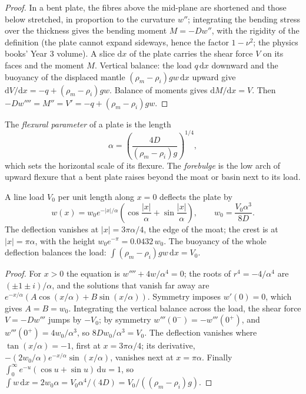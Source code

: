 \begin{proof}
In a bent plate, the fibres above the mid-plane are shortened and those below
stretched, in proportion to the curvature $w''$; integrating the bending
stress over the thickness gives the bending moment $M = -Dw''$, with the
rigidity of the definition (the plate cannot expand sideways, hence the factor
$1 - \nu^2$; the physics books' Year 3 volume). A slice $\mathrm dx$ of the plate
carries the shear force $V$ on its faces and the moment $M$. Vertical balance:
the load $q\,\mathrm dx$ downward and the buoyancy of the displaced mantle
$(\rho_m - \rho_i)gw\,\mathrm dx$ upward give $\mathrm dV/\mathrm dx = -q +
(\rho_m - \rho_i)gw$. Balance of moments gives $\mathrm dM/\mathrm dx = V$.
Then $-Dw'''' = M'' = V' = -q + (\rho_m - \rho_i)gw$.
\end{proof}

\begin{definition}\label{def:b3:gravity-geodesy:alpha}
The \emph{flexural parameter} of a plate is the
length
\[
  \alpha = \left(\frac{4D}{(\rho_m - \rho_i)g}\right)^{1/4},
\]
which sets the horizontal scale of its flexure. The \emph{forebulge}
is the low arch of upward flexure that a bent plate raises beyond the moat or
basin next to its load.
\end{definition}

\begin{proposition}\label{prop:b3:gravity-geodesy:line}
A line load $V_0$ per unit length along $x = 0$ deflects the plate by
\[
  w(x) = w_0e^{-|x|/\alpha}\left(\cos\frac{|x|}{\alpha} + \sin\frac{|x|}{\alpha}\right),
  \qquad w_0 = \frac{V_0\alpha^3}{8D} .
\]
The deflection vanishes at $|x| = 3\pi\alpha/4$, the edge of the moat; the
 crest is at $|x| = \pi\alpha$, with the height $w_0e^{-\pi} =
\num{0.0432}\,w_0$. The buoyancy of the whole deflection balances the load:
$\int(\rho_m - \rho_i)gw\,\mathrm dx = V_0$.
\end{proposition}

\begin{proof}
For $x > 0$ the equation is $w'''' + 4w/\alpha^4 = 0$; the roots of
$r^4 = -4/\alpha^4$ are $(\pm1 \pm i)/\alpha$, and the solutions that vanish far
away are $e^{-x/\alpha}(A\cos(x/\alpha) + B\sin(x/\alpha))$. Symmetry imposes
$w'(0) = 0$, which gives $A = B = w_0$. Integrating the vertical balance across
the load, the shear force $V = -Dw'''$ jumps by $-V_0$; by symmetry
$w'''(0^-) = -w'''(0^+)$, and $w'''(0^+) = 4w_0/\alpha^3$, so $8Dw_0/\alpha^3 =
V_0$. The deflection vanishes where $\tan(x/\alpha) =
-1$, first at $x = 3\pi\alpha/4$; its derivative,
$-(2w_0/\alpha)e^{-x/\alpha}\sin(x/\alpha)$, vanishes next at $x = \pi\alpha$.
Finally $\int_0^\infty e^{-u}(\cos u + \sin u)\,\mathrm du = 1$, so
$\int w\,\mathrm dx = 2w_0\alpha = V_0\alpha^4/(4D) = V_0/((\rho_m - \rho_i)g)$.
\end{proof}

